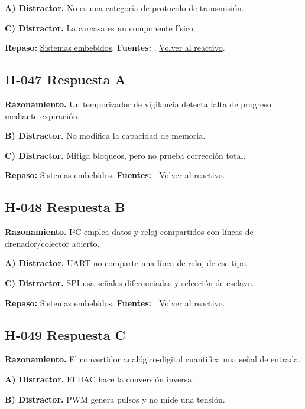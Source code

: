\textbf{A) Distractor. }No es una categoría de protocolo de transmisión.

\textbf{C) Distractor. }La carcasa es un componente físico.

\textbf{Repaso:} \hyperref[sec:h3]{Sistemas embebidos}. \textbf{Fuentes:} \cite{avr,arduino,sensors}. \hyperref[q:H-046]{Volver al reactivo}.\par\medskip

\subsection*{H-047 \quad Respuesta A}\label{s:H-047}
\textbf{Razonamiento.} Un temporizador de vigilancia detecta falta de progreso mediante expiración.

\textbf{B) Distractor. }No modifica la capacidad de memoria.

\textbf{C) Distractor. }Mitiga bloqueos, pero no prueba corrección total.

\textbf{Repaso:} \hyperref[sec:h3]{Sistemas embebidos}. \textbf{Fuentes:} \cite{avr,arduino,sensors}. \hyperref[q:H-047]{Volver al reactivo}.\par\medskip

\subsection*{H-048 \quad Respuesta B}\label{s:H-048}
\textbf{Razonamiento.} I²C emplea datos y reloj compartidos con líneas de drenador/colector abierto.

\textbf{A) Distractor. }UART no comparte una línea de reloj de ese tipo.

\textbf{C) Distractor. }SPI usa señales diferenciadas y selección de esclavo.

\textbf{Repaso:} \hyperref[sec:h3]{Sistemas embebidos}. \textbf{Fuentes:} \cite{avr,arduino,sensors}. \hyperref[q:H-048]{Volver al reactivo}.\par\medskip

\subsection*{H-049 \quad Respuesta C}\label{s:H-049}
\textbf{Razonamiento.} El convertidor analógico-digital cuantifica una señal de entrada.

\textbf{A) Distractor. }El DAC hace la conversión inversa.

\textbf{B) Distractor. }PWM genera pulsos y no mide una tensión.

